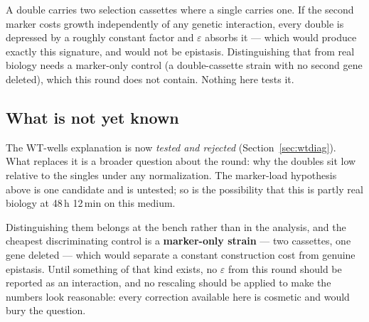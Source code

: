  A double carries two selection cassettes where a single carries
one. If the second marker costs growth independently of any genetic interaction, every double
is depressed by a roughly constant factor and $\varepsilon$ absorbs it --- which would produce
exactly this signature, and would not be epistasis. Distinguishing that from real biology
needs a marker-only control (a double-cassette strain with no second gene deleted), which this
round does not contain. Nothing here tests it.

\subsection{What is not yet known}

The WT-wells explanation is now \emph{tested and rejected} (Section~\ref{sec:wtdiag}). What
replaces it is a broader question about the round: why the doubles sit low relative to the
singles under any normalization. The marker-load hypothesis above is one candidate and is
untested; so is the possibility that this is partly real biology at 48\,h 12\,min on this medium.

Distinguishing them belongs at the bench rather than in the analysis, and the cheapest
discriminating control is a \textbf{marker-only strain} --- two cassettes, one gene deleted ---
which would separate a constant construction cost from genuine epistasis. Until something of
that kind exists, no $\varepsilon$ from this round should be reported as an interaction,
and no rescaling should be applied to make the numbers look reasonable: every correction
available here is cosmetic and would bury the question.
